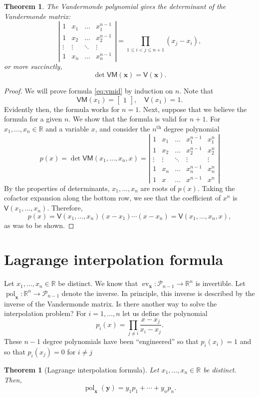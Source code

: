 \documentclass[12pt]{article}
\newtheorem{theorem}[proposition]{Theorem}
\theoremstyle{definition}
\newcommand{\bmat}[1]{\begin{bmatrix}#1\end{bmatrix}}
\newcommand{\bx}{\mathbf{x}}
\newcommand{\by}{\mathbf{y}}
\newcommand{\ev}{\operatorname{ev}}
\newcommand{\pol}{\operatorname{pol}}
\newcommand{\cP}{\mathcal{P}}
\newcommand{\VM}{\mathsf{VM}}
\newcommand{\VD}{\mathsf{V}}
\newcommand{\Rset}{\mathbb{R}}
\begin{document}
\begin{theorem}
  The Vandermonde polynomial gives the determinant of the Vandermonde
  matrix:
  \begin{equation}
    \label{eq:vmid}
    \left| \begin{matrix}
        1 & x_1 & \ldots & x_1^{n-1} \\
        1 & x_2 & \ldots &x_2^{n-1} \\
        \vdots &  \vdots & \ddots  & \vdots \\
        1 & x_{n}  & \ldots & x_{n}^{n-1} 
      \end{matrix}
    \right| = \prod_{1\leq i< j\leq n+1}
    (x_j-x_i),    
  \end{equation}
    or more succinctly,
    \[ \det \VM(\bx) = \VD(\bx).\]
\end{theorem}
\begin{proof}
  We will prove formula \eqref{eq:vmid} by induction on $n$.  Note
  that
  \[ \VM(x_1) = \bmat{1},\quad \VD(x_1) = 1 .\] Evidently then, the
  formula works for $n=1$. Next, suppose that we believe the formula
  for a given $n$.  We show that the formula is valid for $n+1$. For
  $x_1,\ldots, x_{n}\in \Rset$ and a variable $x$, and consider the
  $n^{\text{th}}$ degree polynomial
  \[ p(x)=\det \VM(x_1,\ldots, x_n,x) = \left| \begin{matrix}
        1 & x_1 & \ldots & x_1^{n-1}& x_1^{n} \\
        1 & x_2 & \ldots &x_2^{n-1}&x_2^{n} \\
        \vdots & \vdots & \ddots  &\vdots& \vdots \\
        1& x_n & \ldots & x_n^{n-1} & x_n^n\\
        1 & x &  \ldots & x^{n-1}& x^n \end{matrix}
    \right|\]
    By the properties of determinants, $x_1,\ldots, x_n$ are roots of
    $p(x)$.  Taking the cofactor expansion along the bottom row, we
    see that the coefficient of $x^n$ is $\VD(x_1,\ldots, x_n)$.
    Therefore,
    \[ p(x) = \VD(x_1,\ldots, x_n) (x-x_1) \cdots (x-x_n) =
    \VD(x_1,\ldots, x_n, x),\]
    as was to be shown.
\end{proof}
\section{Lagrange interpolation formula}  Let
$x_1,\ldots, x_n\in \Rset$ be distinct.  We know that
$\ev_\bx:\cP_{n-1}\to\Rset^n$ is invertible.  Let
$\pol_\bx:\Rset^n\to \cP_{n-1}$ denote the inverse.  In principle,
this inverse is described by the inverse of the Vandermonde matrix.
Is there another way to solve the interpolation problem?  For
$i=1,\ldots, n$ let us define the polynomial
\[ p_i(x) = \prod_{j\neq i} \frac{x-x_j}{x_i- x_j} .\] These $n-1$
degree polynomials have been ``engineered'' so that $p_i(x_i) = 1$ and
so that $p_i(x_j) = 0$ for $i\neq j$
\begin{theorem}[Lagrange interpolation formula]
  Let $x_1,\ldots, x_n\in \Rset$ be distinct.  Then,
  \[ \pol_\bx(\by) = y_1 p_1 + \cdots + y_n p_n.\]  
\end{theorem}
\end{document}
